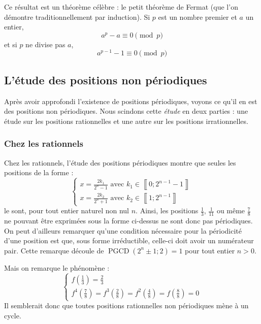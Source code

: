 \documentclass[a4paper,french,12pt]{article}
\begin{document}
Ce résultat est un théorème célèbre : le petit théorème de Fermat (que l'on démontre traditionnellement par induction). Si $p$ est un nombre premier et $a$ un entier,
\[a^p-a\equiv0\pmod{p}\]
et si $p$ ne divise pas $a$,
\[a^{p-1}-1\equiv0\pmod{p}\]

\hypertarget{1}{}
\subsection{L'étude des positions non périodiques}
Après avoir approfondi l'existence de positions périodiques, voyons ce qu'il en est des positions non périodiques. Nous scindons cette \emph{étude} en deux parties : une étude sur les positions rationnelles et une autre sur les positions irrationnelles.
\subsubsection{Chez les rationnels}
Chez les rationnels, l'étude des positions périodiques montre que seules les positions de la forme :
\[\begin{cases}x=\frac{2k_1}{2^n-1}\text{ avec }k_1\in\left\llbracket0;2^{n-1}-1\right\rrbracket\\x=\frac{2k_2}{2^n+1}\text{ avec }k_2\in\left\llbracket1;2^{n-1}\right\rrbracket\end{cases}\]
le sont, pour tout entier naturel non nul $n$. Ainsi, les positions $\frac{1}{3}$, $\frac{1}{11}$ ou même $\frac{7}{8}$ ne pouvant être exprimées sous la forme ci-dessus ne sont donc pas périodiques. On peut d'ailleurs remarquer qu'une condition nécessaire pour la périodicité d'une position est que, sous forme irréductible, celle-ci doit avoir un numérateur pair. Cette remarque découle de $\operatorname{PGCD}\left(2^n\pm1;2\right)=1$ pour tout entier $n>0$.

Mais on remarque le phénomène :
\[\begin{cases}f\left(\frac{1}{3}\right)=\frac{2}{3}\\f^4\left(\frac{7}{8}\right)=f^3\left(\frac{2}{8}\right)=f^2\left(\frac{4}{8}\right)=f\left(\frac{8}{8}\right)=0\end{cases}\]
Il semblerait donc que toutes positions rationnelles non périodiques mène à un cycle.


\end{document}
